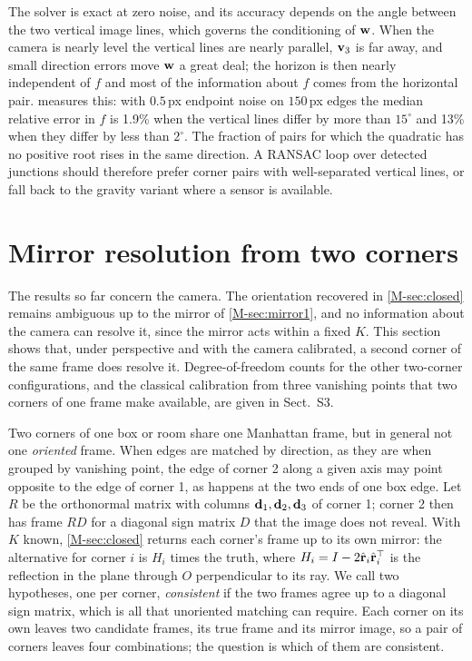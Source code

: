 The solver is exact at zero noise, and its accuracy depends on the angle between the two vertical image lines, which governs the conditioning of $\mathbf{w}$. When the camera is nearly level the vertical lines are nearly parallel, $\mathbf{v}_3$ is far away, and small direction errors move $\mathbf{w}$ a great deal; the horizon is then nearly independent of $f$ and most of the information about $f$ comes from the horizontal pair.  measures this: with $0.5$\,px endpoint noise on $150$\,px edges the median relative error in $f$ is 1.9\% when the vertical lines differ by more than $15^\circ$ and 13\% when they differ by less than $2^\circ$. The fraction of pairs for which the quadratic has no positive root rises in the same direction. A RANSAC loop over detected junctions should therefore prefer corner pairs with well-separated vertical lines, or fall back to the gravity variant where a sensor is available.


\section{Mirror resolution from two corners}\label{sec:mirror}\label{sec:two}

The results so far concern the camera. The orientation recovered in \cref{M-sec:closed} remains ambiguous up to the mirror of \cref{M-sec:mirror1}, and no information about the camera can resolve it, since the mirror acts within a fixed $K$. This section shows that, under perspective and with the camera calibrated, a second corner of the same frame does resolve it. Degree-of-freedom counts for the other two-corner configurations, and the classical calibration from three vanishing points that two corners of one frame make available, are given in Sect.~S3.


Two corners of one box or room share one Manhattan frame, but in general not one \emph{oriented} frame. When edges are matched by direction, as they are when grouped by vanishing point, the edge of corner 2 along a given axis may point opposite to the edge of corner 1, as happens at the two ends of one box edge. Let $R$ be the orthonormal matrix with columns $\mathbf{d}_1,\mathbf{d}_2,\mathbf{d}_3$ of corner 1; corner 2 then has frame $RD$ for a diagonal sign matrix $D$ that the image does not reveal. With $K$ known, \cref{M-sec:closed} returns each corner's frame up to its own mirror: the alternative for corner $i$ is $H_i$ times the truth, where $H_i=I-2\hat{\mathbf{r}}_i\hat{\mathbf{r}}_i^{\top}$ is the reflection in the plane through $O$ perpendicular to its ray. We call two hypotheses, one per corner, \emph{consistent} if the two frames agree up to a diagonal sign matrix, which is all that unoriented matching can require. Each corner on its own leaves two candidate frames, its true frame and its mirror image, so a pair of corners leaves four combinations; the question is which of them are consistent.

